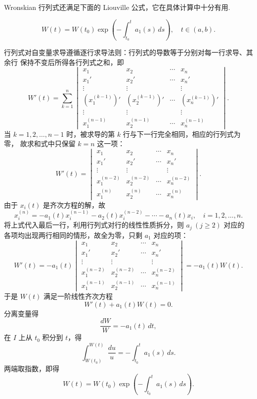 Wronskian 行列式还满足下面的 Liouville 公式，它在具体计算中十分有用.
\begin{thm}[(Liouville 公式)]\label{thm:3.2.9}
\[
W(t)=W(t_0)\exp\left(-\int_{t_0}^{t}a_1(s)\,ds\right),\quad t\in (a,b).
\]
\end{thm}
\begin{pf1}
行列式对自变量求导遵循逐行求导法则：行列式的导数等于分别对每一行求导、其余行
保持不变后所得各行列式之和，即
\[
W'(t)=\sum_{k=1}^{n}
\begin{vmatrix}
x_1 & x_2 & \cdots & x_n\\
x_1' & x_2' & \cdots & x_n'\\
\vdots & \vdots & & \vdots\\
\left(x_1^{(k-1)}\right)' & \left(x_2^{(k-1)}\right)' & \cdots
& \left(x_n^{(k-1)}\right)'\\
\vdots & \vdots & & \vdots\\
x_1^{(n-1)} & x_2^{(n-1)} & \cdots & x_n^{(n-1)}
\end{vmatrix}.
\]
当 $k=1,2,\dots,n-1$ 时，被求导的第 $k$ 行与下一行完全相同，相应的行列式为零，
故求和式中只保留 $k=n$ 这一项：
\[
W'(t)=
\begin{vmatrix}
x_1 & x_2 & \cdots & x_n\\
x_1' & x_2' & \cdots & x_n'\\
\vdots & \vdots & & \vdots\\
x_1^{(n-2)} & x_2^{(n-2)} & \cdots & x_n^{(n-2)}\\
x_1^{(n)} & x_2^{(n)} & \cdots & x_n^{(n)}
\end{vmatrix}.
\]
由于 $x_i(t)$ 是齐次方程的解，故
\[
x_i^{(n)}=-a_1(t)x_i^{(n-1)}-a_2(t)x_i^{(n-2)}-\cdots-a_n(t)x_i,
\quad i=1,2,\dots,n.
\]
将上式代入最后一行，利用行列式对行的线性性质拆分，则 $a_j\ (j\ge2)$ 对应的
各项均出现两行相同的情形，故全为零，只剩 $a_1$ 对应的项：
\[
W'(t)=-a_1(t)
\begin{vmatrix}
x_1 & x_2 & \cdots & x_n\\
x_1' & x_2' & \cdots & x_n'\\
\vdots & \vdots & & \vdots\\
x_1^{(n-2)} & x_2^{(n-2)} & \cdots & x_n^{(n-2)}\\
x_1^{(n-1)} & x_2^{(n-1)} & \cdots & x_n^{(n-1)}
\end{vmatrix}
=-a_1(t)W(t).
\]
于是 $W(t)$ 满足一阶线性齐次方程
\[
W'(t)+a_1(t)W(t)=0.
\]
分离变量得
\[
\frac{dW}{W}=-a_1(t)\,dt,
\]
在 $I$ 上从 $t_0$ 积分到 $t$，得
\[
\int_{W(t_0)}^{W(t)}\frac{du}{u}
=-\int_{t_0}^{t}a_1(s)\,ds.
\]
两端取指数，即得
\[
W(t)=W(t_0)\exp\left(-\int_{t_0}^{t}a_1(s)\,ds\right).
\]
\end{pf1}

